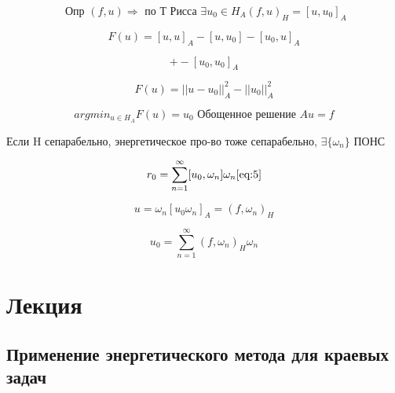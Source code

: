 \documentclass[12pt, a4paper]{article}
\begin{document}
\[ \textrm{ Опр } (f, u) \Rightarrow \textrm{ по Т Рисса } \exists u_0\in H_A (f, u)_H = [u, u_0]_A \]

\[ F(u) = [u, u]_A - [u, u_0] - [u_0, u]_A \]

\[ +-[u_0, u_0]_A \label{eq:4}\]

\[ F(u) = || u - u_0 ||^2_A - ||u_0||^2_A  \]

\[ argmin_{u \in H_A} F(u) = u_0 \textrm{ Обощенное решение } Au = f \]

Если H сепарабельно, энергетическое про-во тоже сепарабельно, $ \exists \{ \omega_n \} $ ПОНС

\[ r_0 = \sum_{n=1}^{\infty} [u_0, \omega_n] \omega_n  \ref{eq:5}\]

\[ u = \omega_n [u_0 \omega_n]_A = (f, \omega_n)_H \]

\[ u_0 = \sum_{n=1}^{\infty} (f, \omega_n)_H \omega_n \]

\section{Лекция }

\subsection{ Применение энергетического метода для краевых задач}
\end{document}
